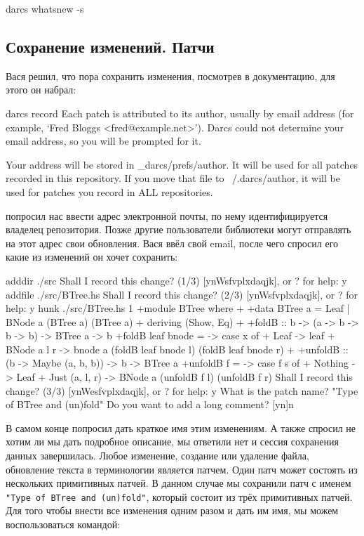 \begin{code}
darcs whatsnew -s
\end{code}

\subsection{Сохранение изменений. Патчи}

Вася решил, что пора сохранить изменения, посмотрев в документацию,
для этого он набрал:

\begin{code}
darcs record
Each patch is attributed to its author, usually by email address (for
example, `Fred Bloggs <fred@example.net>').  Darcs could not determine
your email address, so you will be prompted for it.

Your address will be stored in _darcs/prefs/author.
It will be used for all patches recorded in this repository.
If you move that file to ~/.darcs/author, it will be used for patches
you record in ALL repositories.
\end{code}

 попросил нас ввести адрес электронной почты,
по нему идентифицируется владелец репозитория. Позже 
другие пользователи библиотеки могут отправлять на этот 
адрес свои обновления. Вася ввёл свой email, после чего
 спросил его какие из изменений он хочет сохранить:

\begin{code}
adddir ./src
Shall I record this change? (1/3)  [ynWsfvplxdaqjk], or ? for help: y
addfile ./src/BTree.hs
Shall I record this change? (2/3)  [ynWsfvplxdaqjk], or ? for help: y
hunk ./src/BTree.hs 1
+module BTree where
+
+data BTree a = Leaf | BNode a (BTree a) (BTree a)
+    deriving (Show, Eq)
+
+foldB :: b -> (a -> b -> b -> b) -> BTree a -> b
+foldB leaf bnode = \x -> case x of
+    Leaf        -> leaf
+    BNode a l r -> bnode a (foldB leaf bnode l) (foldB leaf bnode r)
+
+unfoldB :: (b -> Maybe (a, b, b)) -> b -> BTree a
+unfoldB f = \s -> case f s of
+    Nothing         -> Leaf
+    Just (a, l, r)  -> BNode a (unfoldB f l) (unfoldB f r)
Shall I record this change? (3/3)  [ynWesfvplxdaqjk], or ? for help: y
What is the patch name? "Type of BTree and (un)fold"
Do you want to add a long comment? [yn]n
\end{code}

В самом конце  попросил дать краткое имя этим изменениям.
А также спросил не хотим ли мы дать подробное описание, мы ответили 
нет и сессия сохранения данных завершилась.
Любое изменение, создание или удаление файла, обновление текста
в терминологии  является патчем. Один патч может
состоять из нескольких примитивных патчей. В данном случае мы сохранили
патч с именем \texttt{"Type of BTree and (un)fold"}, который 
состоит из трёх примитивных патчей.
 Для того чтобы внести 
все изменения одним разом и дать им имя, мы можем воспользоваться 
командой:

